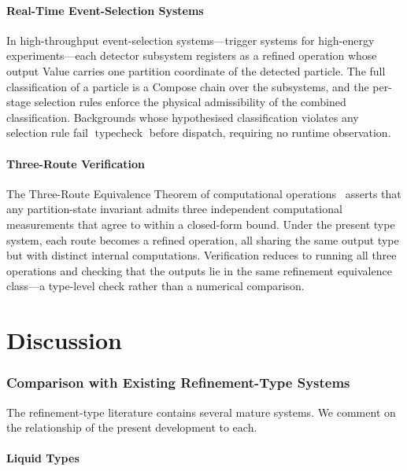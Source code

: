 \documentclass[twocolumn,11pt,a4paper]{article}
\DeclareMathOperator{\typecheck}{typecheck}
\begin{document}
\subsection{Real-Time Event-Selection Systems}

In high-throughput event-selection systems---trigger systems for high-energy experiments---each detector subsystem registers as a refined operation whose output Value carries one partition coordinate of the detected particle. The full classification of a particle is a Compose chain over the subsystems, and the per-stage selection rules enforce the physical admissibility of the combined classification. Backgrounds whose hypothesised classification violates any selection rule fail $\typecheck$ before dispatch, requiring no runtime observation.

\subsection{Three-Route Verification}

The Three-Route Equivalence Theorem of computational operations~\citep{sachikonye2026coe} asserts that any partition-state invariant admits three independent computational measurements that agree to within a closed-form bound. Under the present type system, each route becomes a refined operation, all sharing the same output type but with distinct internal computations. Verification reduces to running all three operations and checking that the outputs lie in the same refinement equivalence class---a type-level check rather than a numerical comparison.

\part{Discussion}

\section{Comparison with Existing Refinement-Type Systems}
\label{sec:related}

The refinement-type literature contains several mature systems. We comment on the relationship of the present development to each.

\subsection{Liquid Types}
\end{document}
